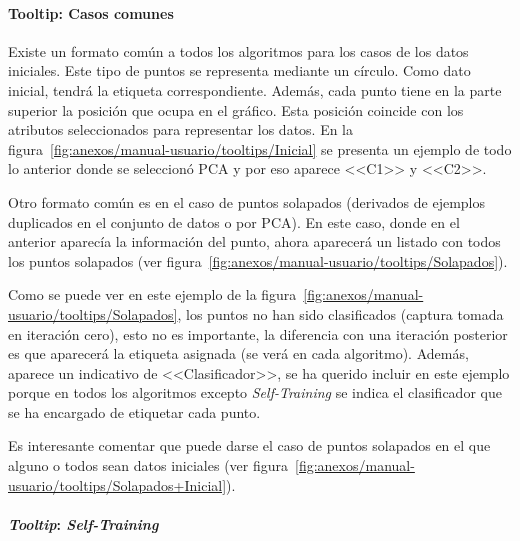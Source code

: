 \paragraph{Tooltip: Casos comunes} %

Existe un formato común a todos los algoritmos para los casos de los datos
iniciales. Este tipo de puntos se representa mediante un círculo. Como dato
inicial, tendrá la etiqueta correspondiente. Además, cada punto tiene en la
parte superior la posición que ocupa en el gráfico. Esta posición coincide con
los atributos seleccionados para representar los datos. En la
figura~\ref{fig:anexos/manual-usuario/tooltips/Inicial} se presenta un ejemplo
de todo lo anterior donde se seleccionó PCA y por eso aparece <<C1>> y <<C2>>.


Otro formato común es en el caso de puntos solapados (derivados de ejemplos
duplicados en el conjunto de datos o por PCA). En este caso, donde en el
anterior aparecía la información del punto, ahora aparecerá un listado con todos
los puntos solapados (ver
figura~\ref{fig:anexos/manual-usuario/tooltips/Solapados}).


Como se puede ver en este ejemplo de la
figura~\ref{fig:anexos/manual-usuario/tooltips/Solapados}, los puntos no han
sido clasificados (captura tomada en iteración cero), esto no es importante, la
diferencia con una iteración posterior es que aparecerá la etiqueta asignada (se
verá en cada algoritmo). Además, aparece un indicativo de <<Clasificador>>, se
ha querido incluir en este ejemplo porque en todos los algoritmos excepto
\textit{Self-Training} se indica el clasificador que se ha encargado de
etiquetar cada punto.

Es interesante comentar que puede darse el caso de puntos solapados en el que
alguno o todos sean datos iniciales (ver
figura~\ref{fig:anexos/manual-usuario/tooltips/Solapados+Inicial}).


\paragraph{\textit{Tooltip}: \textit{Self-Training}}

